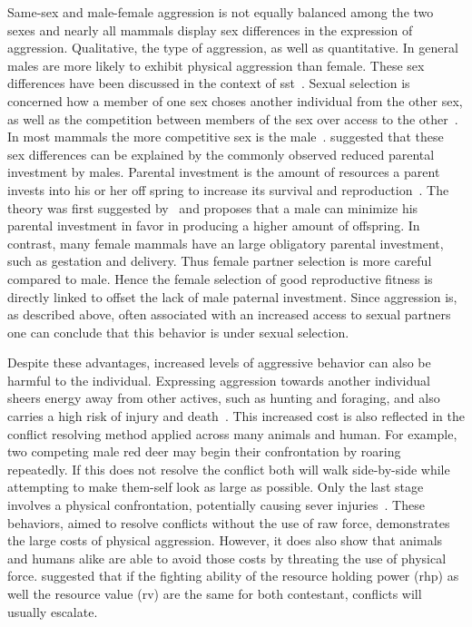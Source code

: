 Same-sex and male-female aggression is not equally balanced among the two sexes and nearly all mammals display sex differences in the expression of aggression.
Qualitative, the type of aggression, as well as quantitative.
In general males are more likely to exhibit physical aggression than female.
These sex differences have been discussed in the context of \acrfull{sst}~\cite{Archer2004,Anderson2002}. 
Sexual selection is concerned how a member of one sex choses another individual from the other sex, as well as the competition between members of the sex over access to the other~\cite{Darwin1859}.
In most mammals the more competitive sex is the male~\cite{Archer2009}. 
\citet{Trivers1972} suggested that these sex differences can be explained by the commonly observed reduced parental investment by males.
Parental investment is the amount of resources a parent invests into his or her off spring to increase its survival and reproduction~\cite{Archer2009}.
The theory was first suggested by~\citet{0198504403} and proposes that a male can minimize his parental investment in favor in producing a higher amount of offspring.
In contrast, many female mammals have an large obligatory parental investment, such as gestation and delivery.
Thus female partner selection is more careful compared to male.
Hence the female selection of good reproductive fitness is directly linked to offset the lack of male paternal investment.
Since aggression is, as described above, often associated with an increased access to sexual partners one can conclude that this behavior is under sexual selection.

Despite these advantages, increased levels of aggressive behavior can also be harmful to the individual.
Expressing aggression towards another individual sheers energy away from other actives, such as hunting and foraging, and also carries a high risk of injury and death~\cite{Packer1995}.  
This increased cost is also reflected in the conflict resolving method applied across many animals and human.
For example, two competing male red deer may begin their confrontation by roaring repeatedly.
If this does not resolve the conflict both will walk side-by-side while attempting to make them-self look as large as possible.
Only the last stage involves a physical confrontation, potentially causing sever injuries~\cite{Clutton-Brock1979a}.
These behaviors, aimed to resolve conflicts without the use of raw force, demonstrates the large costs of physical aggression.
However, it does also show that animals and humans alike are able to avoid those costs by threating the use of physical force.
\citet{Maxson2005} suggested that if the fighting ability of the resource holding power (\acrshort{rhp}) as well the resource value (\acrshort{rv}) are the same for both contestant, conflicts will usually escalate.

